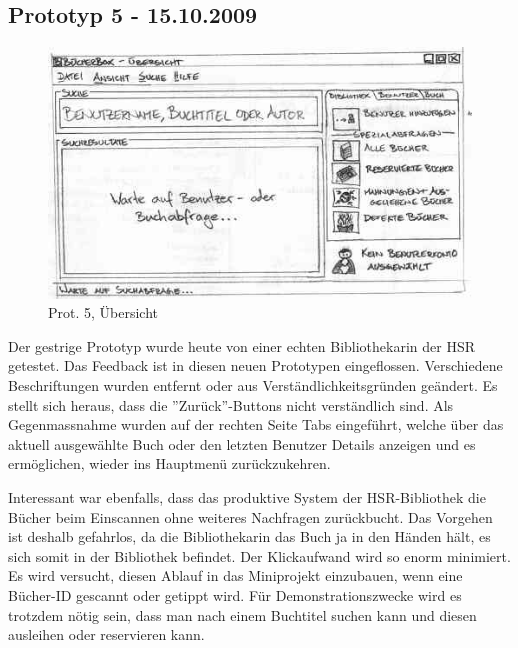 \documentclass[10pt, a4paper]{scrartcl}
\begin{document}
\subsection{Prototyp 5 - 15.10.2009}
\begin{figure}
  \begin{center}
   \includegraphics{prototyp5Thumbnail} \\
   Prot. 5, Übersicht
  \end{center}
\end{figure}
Der gestrige Prototyp wurde heute von einer echten Bibliothekarin der HSR getestet. Das Feedback ist in diesen neuen Prototypen eingeflossen. Verschiedene Beschriftungen wurden entfernt oder aus Verständlichkeitsgründen geändert. Es stellt sich heraus, dass die ''Zurück''-Buttons nicht verständlich sind. 
Als Gegenmassnahme wurden auf der rechten Seite Tabs eingeführt, welche über das aktuell ausgewählte Buch oder den letzten Benutzer Details anzeigen und es ermöglichen, wieder ins Hauptmenü zurückzukehren.

Interessant war ebenfalls, dass das produktive System der HSR-Bibliothek die Bücher beim Einscannen ohne weiteres Nachfragen zurückbucht. Das Vorgehen ist deshalb gefahrlos, da die Bibliothekarin das Buch ja in den Händen hält, es sich somit in der Bibliothek befindet. Der Klickaufwand wird so enorm minimiert. Es wird versucht, diesen Ablauf in das Miniprojekt einzubauen, wenn eine Bücher-ID gescannt oder getippt wird. Für Demonstrationszwecke wird es trotzdem nötig sein, dass man nach einem Buchtitel suchen kann und diesen ausleihen oder reservieren kann.
\end{document}
